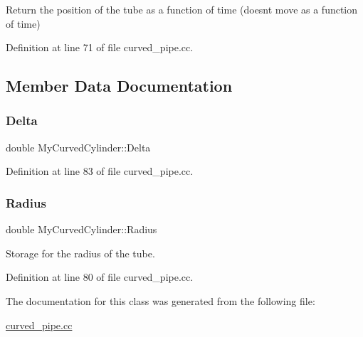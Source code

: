 Return the position of the tube as a function of time (doesn\textquotesingle{}t move as a function of time) 

Definition at line 71 of file curved\+\_\+pipe.\+cc.



\subsection{Member Data Documentation}
\mbox{\label{classMyCurvedCylinder_abacb5dddfb1971d098b2c07608fdaf50}} 
\subsubsection{\texorpdfstring{Delta}{Delta}}
{\footnotesize\ttfamily double My\+Curved\+Cylinder\+::\+Delta\hspace{0.3cm}{\ttfamily [private]}}



Definition at line 83 of file curved\+\_\+pipe.\+cc.

\mbox{\label{classMyCurvedCylinder_aaf7aa0ded93fced8b112d61e634a9df2}} 
\subsubsection{\texorpdfstring{Radius}{Radius}}
{\footnotesize\ttfamily double My\+Curved\+Cylinder\+::\+Radius\hspace{0.3cm}{\ttfamily [private]}}



Storage for the radius of the tube. 



Definition at line 80 of file curved\+\_\+pipe.\+cc.



The documentation for this class was generated from the following file\+:\begin{DoxyCompactItemize}
\item 
\hyperlink{curved__pipe_8cc}{curved\+\_\+pipe.\+cc}\end{DoxyCompactItemize}
